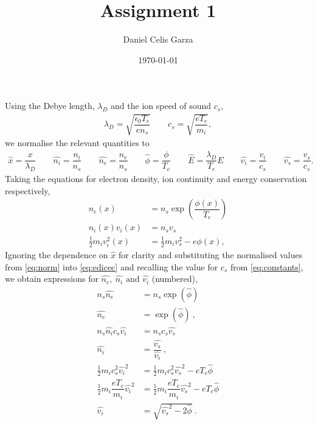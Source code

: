 \documentclass[10pt,a4paper]{article}
\begin{document}
	\title{Assignment 1}
	\author{Daniel Celis Garza}
	\date{\today}
	\maketitle
	
	Using the Debye length, $\lambda_{D}$ and the ion speed of sound $c_{s}$,
	\begin{align} \label{eq:constants}
		\lambda_{D} = \sqrt{\dfrac{\epsilon_{0} T_{e}}{e n_s}} \qquad
		c_{s} = \sqrt{\dfrac{e T_{e}}{m_{i}}},
	\end{align}
	we normalise the relevant quantities to
	\begin{align} \label{eq:norm}
		\hat{x} = \dfrac{x}{\lambda_{D}} \qquad
		\widehat{n_{i}} = \dfrac{n_{i}}{n_{s}} \qquad
		\widehat{n_{e}} = \dfrac{n_{e}}{n_{s}} \qquad
		\hat{\phi} = \dfrac{\phi}{T_{e}} \qquad
		\hat{E} = \dfrac{\lambda_{D}}{T_{e}} E \qquad
		\widehat{v_{i}} = \dfrac{v_{i}}{c_{s}} \qquad
		\widehat{v_{s}} = \dfrac{v_{s}}{c_{s}}.
	\end{align}
	Taking the equations for electron density, ion continuity and energy conservation respectively,	
	\begin{subequations}
		\begin{align} \label{eq:edicec}
			n_{e}(x) &= n_{s} \exp\left(\dfrac{\phi(x)}{T_{e}}\right)\\
			n_{i}(x) v_{i}(x) &= n_{s} v_{s} \\
			\frac{1}{2} m_{i} v_{i}^{2}(x) &= \frac{1}{2}m_{i} v_{s}^{2} - e \phi(x),
		\end{align}
	\end{subequations}
	Ignoring the dependence on $\hat{x}$ for clarity and substituting the normalised values from \cref{eq:norm} into \cref{eq:edicec} and recalling the value for $c_{s}$ from \cref{eq:constants}, we obtain expressions for $\widehat{n_{e}},~\widehat{n_{i}} \textrm{ and } \widehat{v_{i}}$ (numbered),
	\begin{subequations}
		\begin{align} \label{eq:nedicec}
			n_{s} \widehat{n_{e}} &= n_{s} \exp\left(\hat{\phi}\right) \nonumber\\
			\widehat{n_{e}} &= \exp\left(\hat{\phi}\right)~, \\
			n_{s} \widehat{n_{i}} c_{s} \widehat{v_{i}} &= n_{s} c_{s} \widehat{v_{s}} \nonumber\\
			\widehat{n_{i}} &= \dfrac{\widehat{v_{s}}}{\widehat{v_{i}}}~, \\
			\frac{1}{2} m_{i} c_{s}^{2} \widehat{v_{i}}^{2} &= \frac{1}{2} m_{i} c_{s}^{2} \widehat{v_{s}}^{2} - e T_{e} \hat{\phi} \nonumber\\
			\frac{1}{2} m_{i} \dfrac{e T_{e}}{m_{i}} \widehat{v_{i}}^{2} &= \frac{1}{2} m_{i} \dfrac{e T_{e}}{m_{i}} \widehat{v_{s}}^{2} - e T_{e} \hat{\phi} \nonumber\\
			\widehat{v_{i}} &= \sqrt{\widehat{v_{s}}^{2} - 2 \hat{\phi}}~.
		\end{align}
	\end{subequations}
\end{document}
